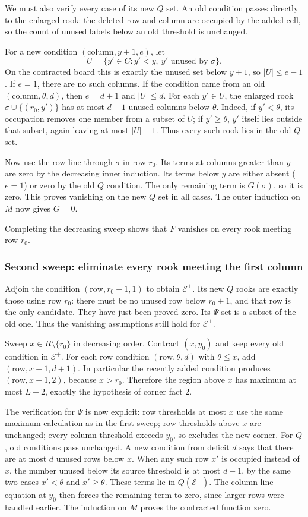 We must also verify every case of its new $Q$ set. An old condition passes directly to the enlarged rook: the deleted row and column are occupied by the added cell, so the count of unused labels below an old threshold is unchanged.

For a new condition $(\mathrm{column},y+1,e)$, let
\[U=\{y'\in C:y'<y,\ y'\text{ unused by }\sigma\}.
\]
On the contracted board this is exactly the unused set below $y+1$, so $|U|\le e-1$. If $e=1$, there are no such columns. If the condition came from an old $(\mathrm{column},\theta,d)$, then $e=d+1$ and $|U|\le d$. For each $y'\in U$, the enlarged rook $\sigma\cup\{(r_0,y')\}$ has at most $d-1$ unused columns below $\theta$. Indeed, if $y'<\theta$, its occupation removes one member from a subset of $U$; if $y'\ge\theta$, $y'$ itself lies outside that subset, again leaving at most $|U|-1$. Thus every such rook lies in the old $Q$ set.

Now use the row line through $\sigma$ in row $r_0$. Its terms at columns greater than $y$ are zero by the decreasing inner induction. Its terms below $y$ are either absent ($e=1$) or zero by the old $Q$ condition. The only remaining term is $G(\sigma)$, so it is zero. This proves vanishing on the new $Q$ set in all cases. The outer induction on $M$ now gives $G=0$.

Completing the decreasing sweep shows that $F$ vanishes on every rook meeting row $r_0$.

\subsubsection{Second sweep: eliminate every rook meeting the first column}
Adjoin the condition $(\mathrm{row},r_0+1,1)$ to obtain $\mathcal E^+$. Its new $Q$ rooks are exactly those using row $r_0$: there must be no unused row below $r_0+1$, and that row is the only candidate. They have just been proved zero. Its $\Psi$ set is a subset of the old one. Thus the vanishing assumptions still hold for $\mathcal E^+$.

Sweep $x\in R\setminus\{r_0\}$ in decreasing order. Contract $(x,y_0)$ and keep every old condition in $\mathcal E^+$. For each row condition $(\mathrm{row},\theta,d)$ with $\theta\le x$, add $(\mathrm{row},x+1,d+1)$. In particular the recently added condition produces $(\mathrm{row},x+1,2)$, because $x>r_0$. Therefore the region above $x$ has maximum at most $L-2$, exactly the hypothesis of corner fact 2.

The verification for $\Psi$ is now explicit: row thresholds at most $x$ use the same maximum calculation as in the first sweep; row thresholds above $x$ are unchanged; every column threshold exceeds $y_0$, so excludes the new corner. For $Q$, old conditions pass unchanged. A new condition from deficit $d$ says that there are at most $d$ unused rows below $x$. When any such row $x'$ is occupied instead of $x$, the number unused below its source threshold is at most $d-1$, by the same two cases $x'<\theta$ and $x'\ge\theta$. These terms lie in $Q(\mathcal E^+)$. The column-line equation at $y_0$ then forces the remaining term to zero, since larger rows were handled earlier. The induction on $M$ proves the contracted function zero.

